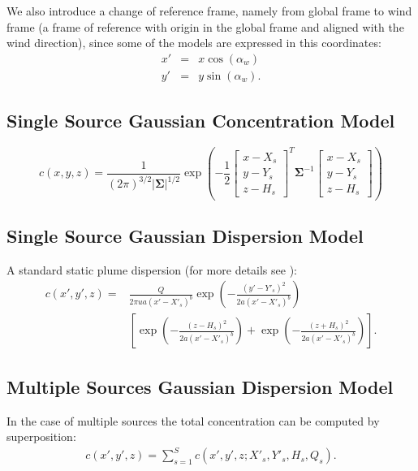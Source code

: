 \documentclass{article}
\begin{document}
We also introduce a change of reference frame, namely from global frame to wind frame (a frame of reference with origin in the global frame and aligned with the wind direction), since some of the models are expressed in this coordinates:
\begin{eqnarray}
x' &=& x \cos(\alpha_w) \\
y' &=& y \sin(\alpha_w).
\end{eqnarray}

\subsection{Single Source Gaussian Concentration Model}
\begin{equation}\label{eqn:singlesourcegaussian}
c(x,y,z) = \frac{1}{(2\pi)^{3/2}|\boldsymbol\Sigma|^{1/2}}
\exp\left(-\frac{1}{2}
\left[\begin{array}{c}
x-X_s\\
y-Y_s\\
z-H_s
\end{array} \right]^T{\boldsymbol\Sigma}^{-1}
\left[\begin{array}{c}
x-X_s\\
y-Y_s\\
z-H_s
\end{array} \right]
\right)
\end{equation}

\subsection{Single Source Gaussian Dispersion Model}

A standard static plume dispersion (for more details see \cite{stockie2011}):
\begin{align}\label{eqn:singlesourcegaussiandispersion}
c(x',y',z) = &\frac{Q}{2\pi u a (x'-X'_s)^b}  \exp \left(-\frac{(y'-Y'_s)^2}{2 a (x'-X'_s)^b}\right) \nonumber \\
  & \left[ \exp \left(-\frac{(z-H_s)^2}{2 a (x'-X'_s)^b}\right) + \exp \left(-\frac{(z+H_s)^2}{2 a (x'-X'_s)^b}\right)\right].
\end{align}


\subsection{Multiple Sources Gaussian Dispersion Model}

In the case of multiple sources the total concentration can be computed by superposition:
\begin{align}\label{eqn:multiplesourcesgaussiandispersion}
c(x',y',z) = \sum_{s=1}^S c(x',y',z;X'_s,Y'_s,H_s,Q_s).
\end{align}
\end{document}
